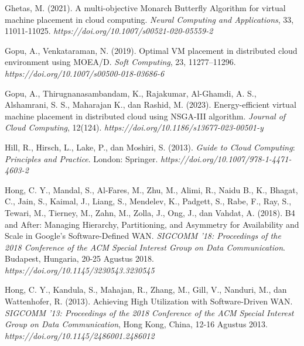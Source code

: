 \begin{thebibliography}{99}
	

	Ghetas, M. (2021). A multi-objective Monarch Butterfly Algorithm for virtual machine placement in cloud computing. \textit{Neural Computing and Applications}, 33, 11011-11025. \textit{https://doi.org/10.1007/s00521-020-05559-2} 
	
	

	Gopu, A., Venkataraman, N. (2019). Optimal VM placement in distributed cloud environment using MOEA/D. \textit{Soft Computing}, 23, 11277–11296. \textit{https://doi.org/10.1007/s00500-018-03686-6}
	
	

	Gopu, A., Thirugnanasambandam, K., Rajakumar, Al-Ghamdi, A. S., Alshamrani, S. S., Maharajan K., dan Rashid, M. (2023). Energy-efficient virtual machine placement in distributed cloud using NSGA-III algorithm. \textit{Journal of Cloud Computing}, 12(124). \textit{https://doi.org/10.1186/s13677-023-00501-y} 
	
	

	Hill, R., Hirsch, L., Lake, P., dan Moshiri, S. (2013). \textit{Guide to Cloud Computing}: \textit{Principles and Practice}. London: Springer. \textit{https://doi.org/10.1007/978-1-4471-4603-2}

	

	Hong, C. Y., Mandal, S., Al-Fares, M., Zhu, M., Alimi, R., Naidu B., K., Bhagat, C., Jain, S., Kaimal, J., Liang, S., Mendelev, K., Padgett, S., Rabe, F., Ray, S., Tewari, M., Tierney, M., Zahn, M., Zolla, J., Ong, J., dan Vahdat, A. (2018). B4 and After: Managing Hierarchy, Partitioning, and Asymmetry for Availability and Scale in Google’s Software-Defined WAN. \textit{SIGCOMM '18: Proceedings of the 2018 Conference of the ACM Special Interest Group on Data Communication}. Budapest, Hungaria, 20-25 Agustus 2018. \textit{https://doi.org/10.1145/3230543.3230545} 
	
	

	Hong, C. Y., Kandula, S., Mahajan, R., Zhang, M., Gill, V., Nanduri, M., dan Wattenhofer, R. (2013). Achieving High Utilization with Software-Driven WAN. \textit{SIGCOMM '13: Proceedings of the 2018 Conference of the ACM Special Interest Group on Data Communication}, Hong Kong, China, 12-16 Agustus 2013. \textit{https://doi.org/10.1145/2486001.2486012}
	

\end{thebibliography}
